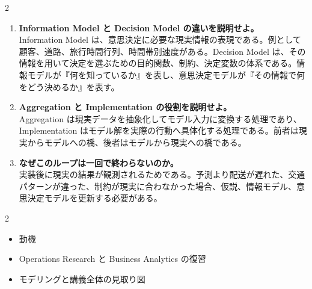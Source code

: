 \begin{multicols}{2}
\begin{enumerate}
\item \textbf{Information Model と Decision Model の違いを説明せよ。}\\
Information Model は、意思決定に必要な現実情報の表現である。例として顧客、道路、旅行時間行列、時間帯別速度がある。Decision Model は、その情報を用いて決定を選ぶための目的関数、制約、決定変数の体系である。情報モデルが『何を知っているか』を表し、意思決定モデルが『その情報で何をどう決めるか』を表す。
\item \textbf{Aggregation と Implementation の役割を説明せよ。}\\
Aggregation は現実データを抽象化してモデル入力に変換する処理であり、Implementation はモデル解を実際の行動へ具体化する処理である。前者は現実からモデルへの橋、後者はモデルから現実への橋である。
\item \textbf{なぜこのループは一回で終わらないのか。}\\
実装後に現実の結果が観測されるためである。予測より配送が遅れた、交通パターンが違った、制約が現実に合わなかった場合、仮説、情報モデル、意思決定モデルを更新する必要がある。
\end{enumerate}

\end{multicols}

\clearpage



\vspace{1.5mm}

\begin{multicols}{2}

\footnotesize

\raggedcolumns


\begin{itemize}
\item 動機
\item Operations Research と Business Analytics の復習
\item モデリングと講義全体の見取り図
\end{itemize}

\end{multicols}

\clearpage


